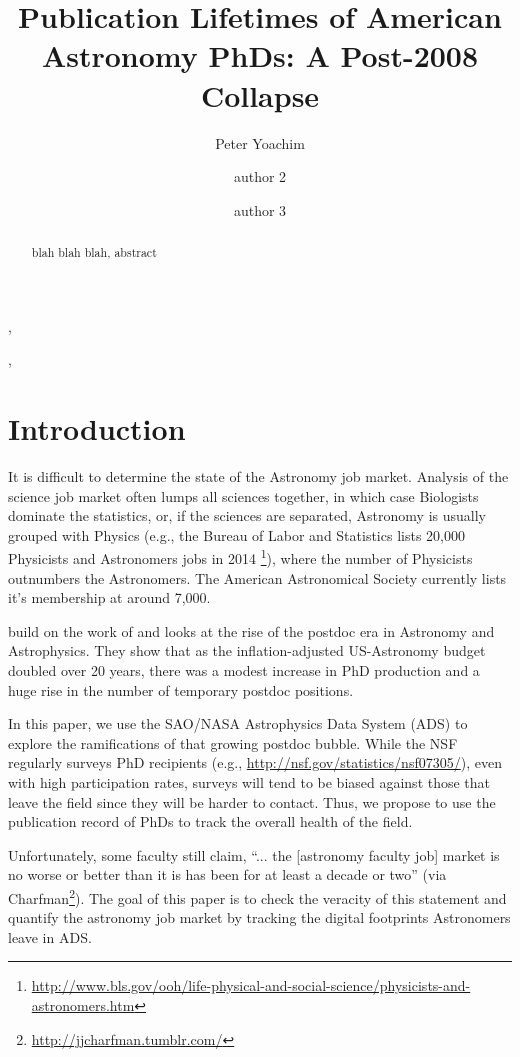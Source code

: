 \documentclass[preprint2]{aastex}
\begin{document}
\title{Publication Lifetimes of American Astronomy PhDs: A Post-2008 Collapse}

\author{Peter Yoachim}, \author{author 2}, \author{author 3} 
  


\begin{abstract}
blah blah blah, abstract

\end{abstract}



\section{Introduction}

It is difficult to determine the state of the Astronomy job market.  Analysis of the science job market often lumps all sciences together, in which case Biologists dominate the statistics, or, if the sciences are separated, Astronomy is usually grouped with Physics (e.g., the Bureau of Labor and Statistics lists 20,000 Physicists and Astronomers jobs in 2014 \footnote{\url{http://www.bls.gov/ooh/life-physical-and-social-science/physicists-and-astronomers.htm}}), where the number of Physicists outnumbers the Astronomers.  The American Astronomical Society currently lists it's membership at around 7,000.

\citet{Seth09} build on the work of \citet{Metcalfe08} and looks at the rise of the postdoc era in Astronomy and Astrophysics.  They show that as the inflation-adjusted US-Astronomy budget doubled over 20 years, there was a modest increase in PhD production and a huge rise in the number of temporary postdoc positions.

In this paper, we use the SAO/NASA Astrophysics Data System (ADS) to explore the ramifications of that growing postdoc bubble.  While the NSF regularly surveys PhD recipients (e.g., \url{http://nsf.gov/statistics/nsf07305/}), even with high participation rates, surveys will tend to be biased against those that leave the field since they will be harder to contact.  Thus, we propose to use the publication record of PhDs to track the overall health of the field.  

Unfortunately, some faculty still claim, ``... the [astronomy faculty job] market is no worse or better than it is has been for at least a decade or two'' (via Charfman\footnote{\url{http://jjcharfman.tumblr.com/}}).  The goal of this paper is to check the veracity of this statement and quantify the astronomy job market by tracking the digital footprints Astronomers leave in ADS. 
\end{document}
